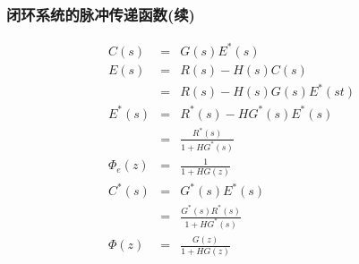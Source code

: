\documentclass[table]{article}
\begin{document}
\begin{frame}
\frametitle{闭环系统的脉冲传递函数(续)}
\label{sec-4-4-2}

\begin{eqnarray*}
C(s) &=& G(s)E^*(s) \\
E(s) &=& R(s)-H(s)C(s) \\
 &=& R(s)-H(s)G(s)E^*(st) \\
E^*(s) &=& R^*(s)-HG^*(s)E^*(s)\\
  &=& \frac{R^*(s)}{1+HG^*(s)} \\
\Phi_e(z) &=& \frac{1}{1+HG(z)} \\
C^*(s) &=& G^*(s)E^*(s)\\
 &=& \frac{G^*(s)R^*(s)}{1+HG^*(s)} \\
\Phi(z) &=& \frac{G(z)}{1+HG(z)} 
\end{eqnarray*}
\end{frame}
\end{document}
